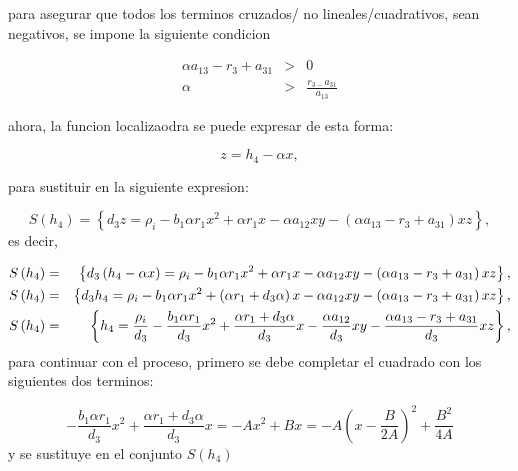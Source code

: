 \documentclass[letterpaper,11pt]{article}
\begin{document}
\bigskip

\bigskip

para asegurar que todos los terminos cruzados/ no lineales/cuadrativos, sean
negativos, se impone la siguiente condicion

\bigskip

\bigskip 
\begin{eqnarray*}
\alpha a_{13}-r_{3}+a_{31} &>&0 \\
\alpha &>&\frac{r_{3-}a_{31}}{a_{13}}
\end{eqnarray*}

\bigskip

ahora, la funcion localizaodra se puede expresar de esta forma:

\begin{equation*}
z=h_{4}-\alpha x,
\end{equation*}

\bigskip para sustituir en la siguiente expresion:

\begin{equation*}
S\left( h_{4}\right) =\left\{ d_{3}z=\rho _{i}-b_{1}\alpha r_{1}x^{2}+\alpha
r_{1}x-\alpha a_{12}xy-\left( \alpha a_{13}-r_{3}+a_{31}\right) xz\right\} ,
\end{equation*}%
es decir,

\begin{eqnarray*}
S\left( h_{4}\right) &=&\left\{ d_{3}\left( h_{4}-\alpha x\right) =\rho
_{i}-b_{1}\alpha r_{1}x^{2}+\alpha r_{1}x-\alpha a_{12}xy-\left( \alpha
a_{13}-r_{3}+a_{31}\right) xz\right\} , \\
S\left( h_{4}\right) &=&\left\{ d_{3}h_{4}=\rho _{i}-b_{1}\alpha
r_{1}x^{2}+\left( \alpha r_{1}+d_{3}\alpha \right) x-\alpha a_{12}xy-\left(
\alpha a_{13}-r_{3}+a_{31}\right) xz\right\} , \\
S\left( h_{4}\right) &=&\left\{ h_{4}=\frac{\rho _{i}}{d_{3}}-\frac{%
b_{1}\alpha r_{1}}{d_{3}}x^{2}+\frac{\alpha r_{1}+d_{3}\alpha }{d_{3}}x-%
\frac{\alpha a_{12}}{d_{3}}xy-\frac{\alpha a_{13}-r_{3}+a_{31}}{d_{3}}%
xz\right\} ,
\end{eqnarray*}%
para continuar con el proceso, primero se debe completar el cuadrado con los
siguientes dos terminos:

\begin{equation*}
-\frac{b_{1}\alpha r_{1}}{d_{3}}x^{2}+\frac{\alpha r_{1}+d_{3}\alpha }{d_{3}}%
x=-Ax^{2}+Bx=-A\left( x-\frac{B}{2A}\right) ^{2}+\frac{B^{2}}{4A}
\end{equation*}%
y se sustituye en el conjunto $S\left( h_{4}\right) $
\end{document}
